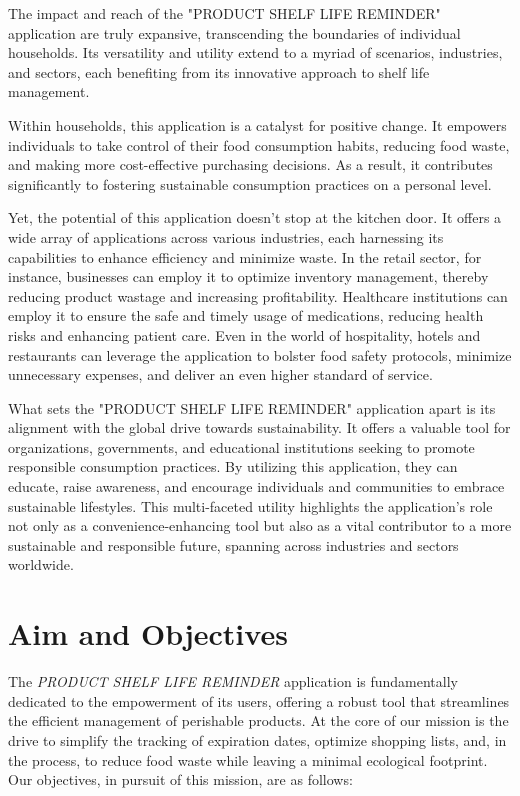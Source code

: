The impact and reach of the "PRODUCT SHELF LIFE REMINDER" application are truly expansive, transcending the boundaries of individual households. Its versatility and utility extend to a myriad of scenarios, industries, and sectors, each benefiting from its innovative approach to shelf life management.

Within households, this application is a catalyst for positive change. It empowers individuals to take control of their food consumption habits, reducing food waste, and making more cost-effective purchasing decisions. As a result, it contributes significantly to fostering sustainable consumption practices on a personal level.

Yet, the potential of this application doesn't stop at the kitchen door. It offers a wide array of applications across various industries, each harnessing its capabilities to enhance efficiency and minimize waste. In the retail sector, for instance, businesses can employ it to optimize inventory management, thereby reducing product wastage and increasing profitability. Healthcare institutions can employ it to ensure the safe and timely usage of medications, reducing health risks and enhancing patient care. Even in the world of hospitality, hotels and restaurants can leverage the application to bolster food safety protocols, minimize unnecessary expenses, and deliver an even higher standard of service.

What sets the "PRODUCT SHELF LIFE REMINDER" application apart is its alignment with the global drive towards sustainability. It offers a valuable tool for organizations, governments, and educational institutions seeking to promote responsible consumption practices. By utilizing this application, they can educate, raise awareness, and encourage individuals and communities to embrace sustainable lifestyles. This multi-faceted utility highlights the application's role not only as a convenience-enhancing tool but also as a vital contributor to a more sustainable and responsible future, spanning across industries and sectors worldwide.

\section{Aim and Objectives}


The \textit{PRODUCT SHELF LIFE REMINDER} application is fundamentally dedicated to the empowerment of its users, offering a robust tool that streamlines the efficient management of perishable products. At the core of our mission is the drive to simplify the tracking of expiration dates, optimize shopping lists, and, in the process, to reduce food waste while leaving a minimal ecological footprint. Our objectives, in pursuit of this mission, are as follows:


